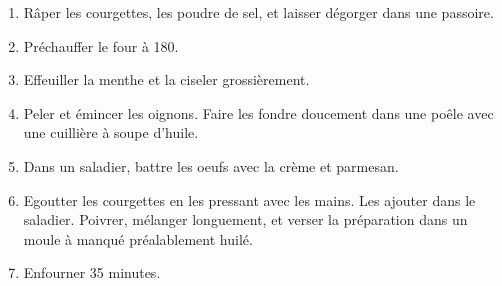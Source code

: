 
\begin{ingredients}
\end{ingredients}


\begin{recipe}
  \begin{enumerate}

  \item R\^aper les courgettes, les poudre de sel, et laisser
    d\'egorger dans une passoire.

  \item Pr\'echauffer le four \`a 180\degreeC.

  \item Effeuiller la menthe et la ciseler grossi\`erement.

  \item Peler et \'emincer les oignons.  Faire les fondre doucement
    dans une  po\^ele avec une cuilli\`ere \`a soupe d'huile.

  \item Dans un saladier, battre les oeufs avec la cr\`eme et
    parmesan.

  \item Egoutter les courgettes en les pressant avec les mains.
    Les ajouter dans le saladier.  Poivrer, m\'elanger longuement, et
    verser la pr\'eparation dans un moule \`a manqu\'e pr\'ealablement
    huil\'e.

  \item Enfourner 35 minutes.

  \end{enumerate}
\end{recipe}
